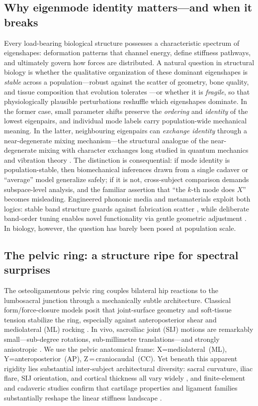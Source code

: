 \documentclass[11pt]{article}
\begin{document}
\subsection*{Why eigenmode identity matters---and when it breaks}
Every load-bearing biological structure possesses a characteristic spectrum of eigenshapes: deformation patterns that channel energy, define stiffness pathways, and ultimately govern how forces are distributed.
A natural question in structural biology is whether the qualitative organization of these dominant eigenshapes is \emph{stable} across a population---robust against the scatter of geometry, bone quality, and tissue composition that evolution tolerates \citep{Kitano2004}---or whether it is \emph{fragile}, so that physiologically plausible perturbations reshuffle which eigenshapes dominate.
In the former case, small parameter shifts preserve the \emph{ordering} and \emph{identity} of the lowest eigenpairs, and individual mode labels carry population-wide mechanical meaning.
In the latter, neighbouring eigenpairs can \emph{exchange identity} through a near-degenerate mixing mechanism---the structural analogue of the near-degenerate mixing with character exchanges long studied in quantum mechanics and vibration theory \citep{Pierre1988,Chen2019Veering}.
The distinction is consequential: if mode identity is population-stable, then biomechanical inferences drawn from a single cadaver or ``average'' model generalize safely; if it is not, cross-subject comparison demands subspace-level analysis, and the familiar assertion that ``the $k$-th mode does $X$'' becomes misleading.
Engineered phononic media and metamaterials exploit both logics: stable band structure guards against fabrication scatter \citep{Hussein2014}, while deliberate band-order tuning enables novel functionality via gentle geometric adjustment \citep{Cummer2016,Kadic2019,Chen2021NatRev}.
In biology, however, the question has barely been posed at population scale.

\subsection*{The pelvic ring: a structure ripe for spectral surprises}
The osteoligamentous pelvic ring couples bilateral hip reactions to the lumbosacral junction through a mechanically subtle architecture.
Classical form/force-closure models posit that joint-surface geometry and soft-tissue tension stabilize the ring, especially against anteroposterior shear and mediolateral (ML) rocking \citep{Snijders1993,Vleeming2012}.
In vivo, sacroiliac joint (SIJ) motions are remarkably small---sub-degree rotations, sub-millimetre translations---and strongly anisotropic \citep{Goode2008,Meijer2014,Keizer2019,Noe2020}.
We use the pelvic anatomical frame: X=mediolateral~(ML), Y=anteroposterior~(AP), Z\,=\,craniocaudal~(CC).
Yet beneath this apparent rigidity lies substantial inter-subject architectural diversity: sacral curvature, iliac flare, SIJ orientation, and cortical thickness all vary widely \citep{Ruff2017,Betti2020,Weber2019,Gruss2015,Whitcome2017,Weiss2020}, and finite-element and cadaveric studies confirm that cartilage properties and ligament families substantially reshape the linear stiffness landscape \citep{Anderson2020,Calixte2022,Yang2020,Song2021}.
\end{document}
